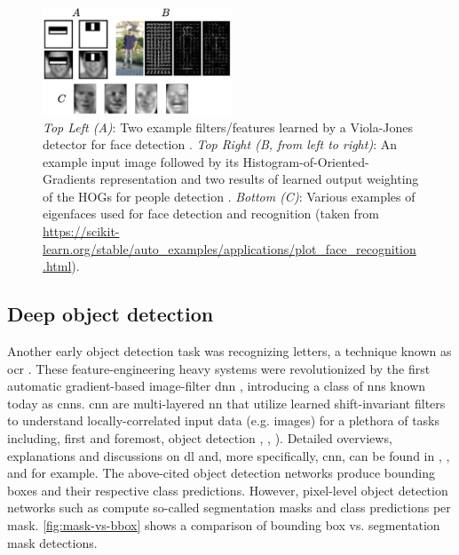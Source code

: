 \documentclass[headsepline, hidelinks, footsepline, footinclude=false, oneside, fontsize=11pt, paper=a4, listof=totoc, bibliography=totoc]{scrbook}
\begin{document}
\begin{figure}[htbp]
\centering
\includegraphics[width=0.5\textwidth]{figures/classical-object-detection.pdf}
\caption{\label{fig:classical-object-detection}\emph{Top Left (A)}: Two example filters/features learned by a Viola-Jones detector for face detection \cite{violaRobustRealtimeFace2004}. \emph{Top Right (B, from left to right)}: An example input image followed by its Histogram-of-Oriented-Gradients representation and two results of learned output weighting of the HOGs for people detection \cite{dalalHistogramsOrientedGradients2005}. \emph{Bottom (C)}: Various examples of eigenfaces used for face detection and recognition (taken from \url{https://scikit-learn.org/stable/auto\_examples/applications/plot\_face\_recognition.html}).}
\end{figure}

\subsection{Deep object detection}
\label{sec:orgc65b510}
    Another early object detection task was recognizing letters, a technique known as \gls{ocr} \cite{schantzHistoryOCROptical1982}.
These feature-engineering heavy systems were revolutionized by the first automatic gradient-based image-filter \gls{dnn} \cite{lecunGradientbasedLearningApplied1998}, introducing a class of \glspl{nn} known today as \glspl{cnn}.
\gls{cnn} are multi-layered \gls{nn} that utilize learned shift-invariant filters to understand locally-correlated input data (e.g. images) for a plethora of tasks including, first and foremost, 
object detection \cite{krizhevskyImageNetClassificationDeep2017}, \cite{renFasterRCNNRealTime2017}, \cite{redmonYouOnlyLook2016}).
Detailed overviews, explanations and discussions on \gls{dl} and, more specifically, \gls{cnn}, can be found in 
\cite{bishopPatternRecognitionMachine2006}, \cite{heatonIanGoodfellowYoshua2018}, and \cite{GuideConvolutionalNeural2017} for example.
The above-cited object detection networks produce bounding boxes and their respective class predictions. 
However, pixel-level object detection networks such as \cite{heMaskRCNN2018} compute so-called segmentation masks and class predictions per mask. \cref{fig:mask-vs-bbox} shows a comparison
of bounding box vs. segmentation mask detections.
\end{document}

